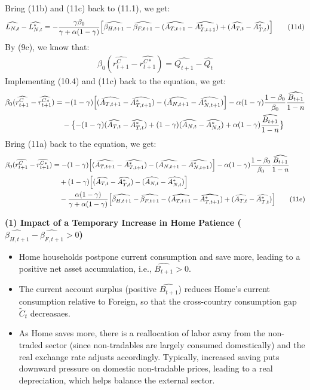\documentclass[a4paper,12pt]{article} %
\theoremstyle{nonitalic}
\begin{document}
Bring (11b) and (11c) back to (11.1), we get:
\begin{gather*}
    \widehat{L_{N,t}} - \widehat{L_{N,t}^*} = - \frac{\gamma \beta_0}{\gamma + \alpha(1-\gamma)} \Bigl[ \widehat{\beta_{H,t+1}} - \widehat{\beta_{F,t+1}} - (\widehat{A_{T,t+1}} - \widehat{A_{T,t+1}^*}) + (\widehat{A_{T,t}} - \widehat{A_{T,t}^*}) \Bigr] \tag{11d}
\end{gather*}
By (9c), we know that:
\begin{gather*}
    \beta_0 (\widehat{r_{t+1}^C} - \widehat{r_{t+1}^{C*}}) = \widehat{Q_{t+1}} - \widehat{Q_t}
\end{gather*}
Implementing (10.4) and (11c) back to the equation, we get:
\begin{align*}
    \beta_0 (\widehat{r_{t+1}^C} - \widehat{r_{t+1}^{C*}}) &= -(1-\gamma) \Bigl[ (\widehat{A_{T,t+1}} - \widehat{A_{T,t+1}^*}) - (\widehat{A_{N,t+1}} - \widehat{A_{N,t+1}^*}) \Bigr] - \alpha (1-\gamma) \frac{1-\beta_0}{\beta_0} \frac{\widehat{B_{t+1}}}{1-n} \\
    & \quad - \bigl\{ -(1-\gamma) (\widehat{A_{T,t}} - \widehat{A_{T,t}^*}) + (1-\gamma) (\widehat{A_{N,t}} - \widehat{A_{N,t}^*}) + \alpha (1-\gamma) \frac{\widehat{B_{t+1}}}{1-n} \bigr\}
\end{align*}
Bring (11a) back to the equation, we get:
\begin{align*}
    \beta_0 (\widehat{r_{t+1}^C} - \widehat{r_{t+1}^{C*}}) &= -(1-\gamma) \Bigl[ (\widehat{A_{T,t+1}} - \widehat{A_{T,t+1}^*}) - (\widehat{A_{N,t+1}} - \widehat{A_{N,t+1}^*}) \Bigr] - \alpha (1-\gamma) \frac{1-\beta_0}{\beta_0} \frac{\widehat{B_{t+1}}}{1-n} \\
    & \quad + (1-\gamma) \Bigl[(\widehat{A_{T,t}} - \widehat{A_{T,t}^*}) - (\widehat{A_{N,t}} - \widehat{A_{N,t}^*}) \Bigr] \\
    & \quad - \frac{\alpha (1-\gamma)}{\gamma + \alpha(1-\gamma)} \Bigl[ \widehat{\beta_{H,t+1}} - \widehat{\beta_{F,t+1}} - (\widehat{A_{T,t+1}} - \widehat{A_{T,t+1}^*}) + (\widehat{A_{T,t}} - \widehat{A_{T,t}^*}) \Bigr] \tag{11e}
\end{align*}

\textbf{(1) Impact of a Temporary Increase in Home Patience (\( \widehat{\beta_{H,t+1}} - \widehat{\beta_{F,t+1}} > 0 \))}
\begin{itemize}
    \item Home households postpone current consumption and save more, leading to a positive net asset accumulation, i.e., \( \widehat{B_{t+1}} > 0 \).
    \item The current account surplus (positive \( \widehat{B_{t+1}} \)) reduces Home's current consumption relative to Foreign, so that the cross-country consumption gap \( \widetilde{C}_t \) decreasaes.
    \item As Home saves more, there is a reallocation of labor away from the non-traded sector (since non-tradables are largely consumed domestically) and the real exchange rate adjusts accordingly. Typically, increased saving puts downward pressure on domestic non-tradable prices, leading to a real depreciation, which helps balance the external sector.
\end{itemize}
\end{document}
